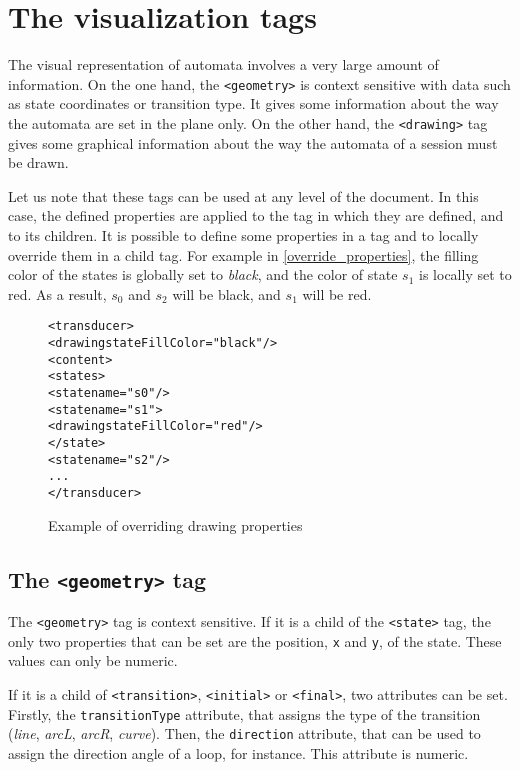 \documentclass[a4paper]{article}
\newcommand{\xtag}[1]{\texttt{<#1>}}
\newcommand{\xattr}[1]{\texttt{#1}}
\def\statetag{\xtag{state}}
\def\transitiontag{\xtag{transition}}
\def\finaltag{\xtag{final}}
\def\initialtag{\xtag{initial}}
\def\geometrytag{\xtag{geometry}}
\def\drawingtag{\xtag{drawing}}
\begin{document}
\newpage
\section{The visualization tags}
\label{title_vizualisation}
The visual representation of automata involves a very large amount of
information. On the one hand, the \geometrytag{} is context sensitive
with data such as state coordinates or transition type. It gives some
information about the way the automata are set in the plane only.  On
the other hand, the \drawingtag{} tag gives some graphical information
about the way the automata of a session must be drawn.

Let us note that these tags can be used at any level of the document.
In this case, the defined properties are applied to the tag in which
they are defined, and to its children. It is possible to define some
properties in a tag and to locally override them in a child tag. For
example in \autoref{override_properties}, the filling color of the
states is globally set to \textit{black}, and the color of state $s_1$
is locally set to red. As a result, $s_0$ and $s_2$ will be black, and
$s_1$ will be red.

\begin{figure}[ht]
  \small
  \begin{center}
\begin{alltt}
<transducer>
  <drawing stateFillColor="black"/>
  <content>
     <states>
        <state name="s0"/>
        <state name="s1">
            <drawing stateFillColor="red"/>
        </state>
        <state name="s2"/>
      ...
</transducer>
\end{alltt}

    \caption{Example of overriding drawing properties}
    \label{override_properties}
  \end{center}
\end{figure}

\subsection{The \geometrytag{} tag}

The \geometrytag{} tag is context sensitive. If it is a child of the
\statetag{} tag, the only two properties that can be set are the
position, \verb|x| and \verb|y|, of the state. These values can only
be numeric.

If it is a child of \transitiontag{}, \initialtag{} or \finaltag{},
two attributes can be set. Firstly, the \xattr{transitionType}
attribute, that assigns the type of the transition (\textit{line},
\textit{arcL}, \textit{arcR}, \textit{curve}). Then, the
\xattr{direction} attribute, that can be used to assign the direction
angle of a loop, for instance. This attribute is numeric.
\end{document}
